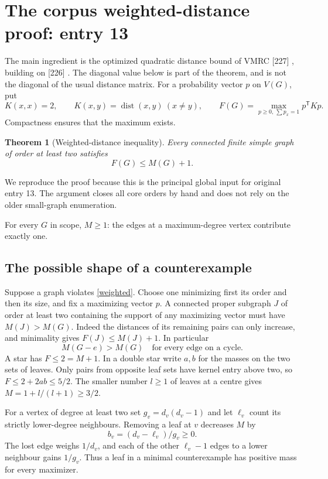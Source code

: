 \documentclass[11pt,a4paper]{article}
\newtheorem{theorem}{Theorem}[section]
\theoremstyle{remark}\newtheorem{remark}[theorem]{Remark}
\DeclareMathOperator{\dist}{dist}
\begin{document}
\section{The corpus weighted-distance proof: entry 13}\label{sec:weighted}
The main ingredient is the optimized quadratic distance bound of VMRC [227]
\cite{vmrc227}, building on [226] \cite{vmrc226}. The diagonal value below
is part of the theorem, and is not the diagonal of the usual distance matrix.
For a probability vector $p$ on $V(G)$, put
\[
 K(x,x)=2,\qquad K(x,y)=\dist(x,y)\ (x\ne y),\qquad
 F(G)=\max_{p\ge0,\,\sum p_x=1}p^{\mathsf T}Kp.
\]
Compactness ensures that the maximum exists.
\begin{theorem}[Weighted-distance inequality]\label{thm:weighted}
Every connected finite simple graph of order at least two satisfies
\begin{equation}\tag{W}\label{weighted}
 F(G)\le M(G)+1.
\end{equation}
\end{theorem}
We reproduce the proof because this is the principal global input for
original entry 13. The argument closes all core orders by hand and does
not rely on the older small-graph enumeration.

For every $G$ in scope, $M\ge1$: the edges at a maximum-degree vertex contribute exactly one.
\subsection{The possible shape of a counterexample}
Suppose a graph violates \eqref{weighted}. Choose one minimizing first its order and then its size, and fix a maximizing vector $p$. A connected proper subgraph $J$ of order at least two containing the support of any maximizing vector must have $M(J)>M(G)$. Indeed the distances of its remaining pairs can only increase, and minimality gives $F(J)\le M(J)+1$. In particular
\begin{equation}
 M(G-e)>M(G)\quad\text{for every edge on a cycle.}\label{supportive}
\end{equation}
A star has $F\le2=M+1$. In a double star write $a,b$ for the masses on the two sets of leaves. Only pairs from opposite leaf sets have kernel entry above two, so $F\le2+2ab\le5/2$. The smaller number $l\ge1$ of leaves at a centre gives $M=1+l/(l+1)\ge3/2$.

For a vertex of degree at least two set $g_v=d_v(d_v-1)$ and let $\ell_v$ count its strictly lower-degree neighbours. Removing a leaf at $v$ decreases $M$ by
\begin{equation}
 b_v=(d_v-\ell_v)/g_v\ge0.\label{bleaf}
\end{equation}
The lost edge weighs $1/d_v$, and each of the other $\ell_v-1$ edges to a lower neighbour gains $1/g_v$. Thus a leaf in a minimal counterexample has positive mass for every maximizer.
\end{document}
